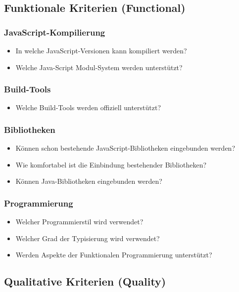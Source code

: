 \subsection{Funktionale Kriterien (Functional)}
\subsubsection{JavaScript-Kompilierung}
\begin{itemize}
	\item In welche JavaScript-Versionen kann kompiliert werden?
	\item Welche Java-Script Modul-System werden unterstützt?
\end{itemize}

\subsubsection{Build-Tools}
\begin{itemize}
	\item Welche Build-Tools werden offiziell unterstützt?
\end{itemize}

\subsubsection{Bibliotheken}
\begin{itemize}
	\item Können schon bestehende JavaScript-Bibliotheken eingebunden werden?
	\item Wie komfortabel ist die Einbindung bestehender Bibliotheken?
	\item Können Java-Bibliotheken eingebunden werden?
\end{itemize}

\subsubsection{Programmierung}
\begin{itemize}
	\item Welcher Programmierstil wird verwendet?
	\item Welcher Grad der Typisierung wird verwendet?
	\item Werden Aspekte der Funktionalen Programmierung unterstützt?
\end{itemize}

\subsection{Qualitative Kriterien (Quality)}
